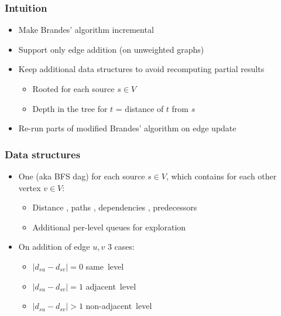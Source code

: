 \begin{frame}
  \frametitle{Intuition}

  \begin{itemize}
    \item Make Brandes' algorithm incremental
    \item Support only edge addition (on unweighted graphs)
    \item Keep additional data structures to avoid recomputing partial results
    \begin{itemize}
      \item Rooted \spdag for each source $s \in V$
      \item Depth in the tree for $t$ = distance of $t$ from $s$
    \end{itemize}
    \item Re-run parts of modified Brandes' algorithm on edge update
  \end{itemize}
    
\end{frame}


\begin{frame}
  \frametitle{Data structures}

  \begin{itemize}
    \item One \spdag (aka BFS dag) for each source $s \in V$, which contains for each other vertex $v \in V$:
    \begin{itemize}
      \item Distance \dist, paths \paths, dependencies \dep, predecessors \pred
      \item Additional per-level queues for exploration
    \end{itemize}
  \end{itemize}
  \begin{itemize}
    \item On addition of edge $u,v$ 3 cases:
    \begin{itemize}
      \item $|d_{su} - d_{sv}| = 0$ same~level
      \item $|d_{su} - d_{sv}| = 1$ adjacent~level
      \item $|d_{su} - d_{sv}| > 1$ non-adjacent~level
    \end{itemize}
  \end{itemize}
      
\end{frame}


